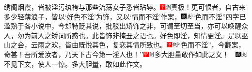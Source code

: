 绣阁烟霞，皆被淫污纨袴与那些流荡女子悉皆玷辱。{\includegraphics[width=3mm]{../Images/00002}\includegraphics[width=3mm]{../Images/00011}\footnotesize \kaishu 真极！}更可恨者，自古来多少轻薄浪子，皆以`好色不淫'为饰，又以`情而不淫'作案，{\includegraphics[width=3mm]{../Images/00005}\includegraphics[width=3mm]{../Images/00012}\footnotesize \kaishu ``色而不淫''四字已滥熟于各小说中，今却特贬其说，批驳出矫饰之非，可谓至切至当，亦可以唤醒众人，勿为前人之矫词所惑也。}此皆饰非掩丑之语也。好色即淫，知情更淫。是以巫山之会，云雨之欢，皆由既悦其色，复恋其情所致也。{\includegraphics[width=3mm]{../Images/00002}\includegraphics[width=3mm]{../Images/00011}\footnotesize \kaishu ``色而不淫''，今翻案，奇甚！}吾所爱汝者，乃天下古今第一淫人也！''{{\includegraphics[width=3mm]{../Images/00002}\includegraphics[width=3mm]{../Images/00011}\footnotesize \kaishu 多大胆量敢作如此之文！　}\includegraphics[width=3mm]{../Images/00005}\includegraphics[width=3mm]{../Images/00012}\footnotesize \kaishu 不见下文，使人一惊。多大胆量，敢如此作文。}

